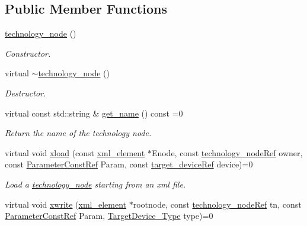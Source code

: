 \subsection*{Public Member Functions}
\begin{DoxyCompactItemize}
\item 
\hyperlink{structtechnology__node_a2a834a84dec715b32269951a618404a9}{technology\+\_\+node} ()
\begin{DoxyCompactList}\small\item\em Constructor. \end{DoxyCompactList}\item 
virtual \hyperlink{structtechnology__node_a4de897021b32eec8181ce09eea74a253}{$\sim$technology\+\_\+node} ()
\begin{DoxyCompactList}\small\item\em Destructor. \end{DoxyCompactList}\item 
virtual const std\+::string \& \hyperlink{structtechnology__node_ade1d568637cfe8de91fc732fba4d62d5}{get\+\_\+name} () const =0
\begin{DoxyCompactList}\small\item\em Return the name of the technology node. \end{DoxyCompactList}\item 
virtual void \hyperlink{structtechnology__node_aab3accd94480958219ca7771dd981a4f}{xload} (const \hyperlink{classxml__element}{xml\+\_\+element} $\ast$Enode, const \hyperlink{technology__node_8hpp_a33dd193b7bd6b987bf0d8a770a819fa7}{technology\+\_\+node\+Ref} owner, const \hyperlink{Parameter_8hpp_a37841774a6fcb479b597fdf8955eb4ea}{Parameter\+Const\+Ref} Param, const \hyperlink{target__device_8hpp_acedb2b7a617e27e6354a8049fee44eda}{target\+\_\+device\+Ref} device)=0
\begin{DoxyCompactList}\small\item\em Load a \hyperlink{structtechnology__node}{technology\+\_\+node} starting from an xml file. \end{DoxyCompactList}\item 
virtual void \hyperlink{structtechnology__node_a8ce6644a0b2700f760936e4c02754e2f}{xwrite} (\hyperlink{classxml__element}{xml\+\_\+element} $\ast$rootnode, const \hyperlink{technology__node_8hpp_a33dd193b7bd6b987bf0d8a770a819fa7}{technology\+\_\+node\+Ref} tn, const \hyperlink{Parameter_8hpp_a37841774a6fcb479b597fdf8955eb4ea}{Parameter\+Const\+Ref} Param, \hyperlink{target__device_8hpp_a476becc690220f0805ce73006449c732}{Target\+Device\+\_\+\+Type} type)=0

\end{DoxyCompactItemize}
